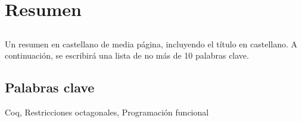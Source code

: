 \chapter*{Resumen}

\section*{\tituloPortadaVal}

Un resumen en castellano de media página, incluyendo el título en castellano. A continuación, se escribirá una lista de no más de 10 palabras clave.


\section*{Palabras clave}

\noindent Coq, Restricciones octagonales, Programación funcional

   



